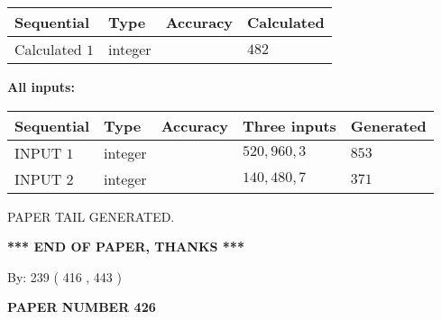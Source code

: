 \documentclass{ctexart}
\begin{document}
   
   
   
\noindent{}
   
   
  
  
\noindent\begin{tabular}{|l|l|l|l|}
\hline
 Sequential & Type & Accuracy & Calculated \\ 
\hline
 
 
  Calculated $  1 $ & integer &  & 
  $ 482 $ 
 \\  \hline  
 \end{tabular}
   
   
   
   
\noindent\vspace{0.1in}\hspace{-0.08in} {\textbf{\Large{All inputs: }}}
   
   
  
  
\noindent\begin{tabular}{|l|l|l|l|l|}
\hline
 Sequential & Type & Accuracy & Three inputs & Generated \\ 
\hline
 
 
  INPUT $  1 $ & integer &  & $
 520
 , 
 960
 , 
 3
 $ & $ 853 $ 
 \\  \hline  
 
 
  INPUT $  2 $ & integer &  & $
 140
 , 
 480
 , 
 7
 $ & $ 371 $ 
 \\  \hline  
 \end{tabular}
   
   
   
   
   
   
 \vspace{0.2in}
 
   
   
\vspace{2.0in} PAPER TAIL GENERATED.
   
   
   
   
\vspace{1.0in} 
{\textbf{\large{ *** END OF PAPER, THANKS *** }}} 
   
   
\hspace{1.0in} By: 
 239 ( 416 ,  443 )
   
   
   
   
\newpage 
\setcounter{page}{ 
   426001 } 
   
   
   
   
 {\textbf{ \Large{ PAPER NUMBER  426  }}}
   
\end{document}
